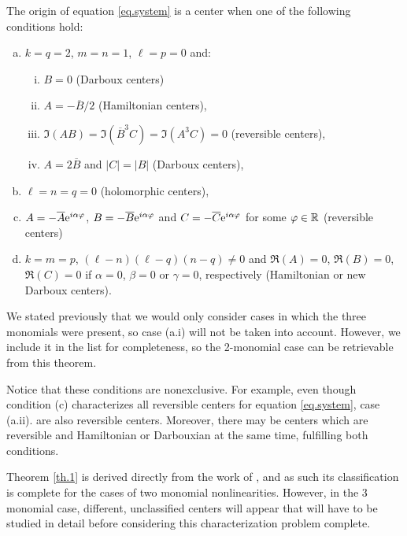 \begin{theorem}
The origin of equation \eqref{eq.system} is a center when one of the following conditions hold:
\begin{enumerate}[(a)]
\item $k=q=2$, $m=n=1$, $\ell=p=0$ and:
\begin{enumerate}[(i)]
\item $B=0$ (Darboux centers)
\item $A=-\overline B/2$ (Hamiltonian centers),
\item $\Im(AB)=\Im(\overline B^3C)=\Im(A^3C)=0$ (reversible centers),
\item $A=2\overline B$ and $|C|=|B|$ (Darboux centers),
\end{enumerate}
\item
$\ell=n=q=0$ (holomorphic centers),
\item
$A=-\overline A\mathrm{e}^{i \alpha \varphi}$, $B=-\overline B\mathrm{e}^{i \alpha \varphi}$ and $C=-\overline C\mathrm{e}^{i \alpha \varphi}$ for some $\varphi\in\mathbb{R}$ (reversible centers)
\item
$k=m=p$, $(\ell-n)(\ell-q)(n-q)\ne0$ and $\Re(A)=0$, $\Re(B)=0$, $\Re(C)=0$ if $\alpha=0$, $\beta=0$ or $\gamma=0$, respectively (Hamiltonian or new Darboux centers).
\end{enumerate}
\label{th.1}
\end{theorem}

We stated previously that we would only consider cases in which the three monomials were present, so case (a.i) will not be taken into account. However, we include it in the list for completeness, so the 2-monomial case can be retrievable from this theorem.

Notice that these conditions are nonexclusive. For example, even though condition (c) characterizes all reversible centers for equation \eqref{eq.system}, case (a.ii). are also reversible centers. Moreover, there may be centers which are reversible and Hamiltonian or Darbouxian at the same time, fulfilling both conditions.

\begin{observacio}
Theorem \ref{th.1} is derived directly from the work of \textcite{Gasull2016}, and as such its classification is complete for the cases of two monomial nonlinearities. However, in the 3 monomial case, different, unclassified centers will appear that will have to be studied in detail before considering this characterization problem complete.
\end{observacio}

